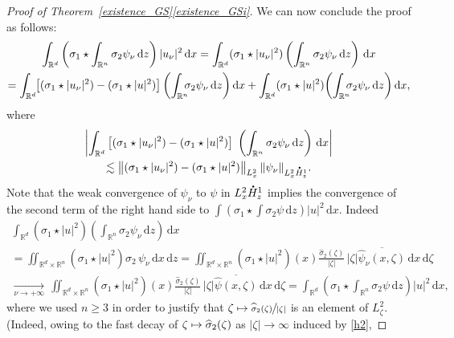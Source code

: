 \documentclass[JEP,XML,SOM,NoEqCountersInSection,NoFloatCountersInSection,Unicode,published]{cedram}
\newcommand\mto{\mathchoice{\longmapsto}{\mapsto}{\mapsto}{\mapsto}}
\theoremstyle{definition}
\newcommand*{\overbigdot}[1]{%
\accentset{\mbox{\large\bfseries .}}{#1}}
\newenvironment{ProofOf}[1]{\begin{proof}[Proof of #1]}{\end{proof}}
\newcommand{\R}{\mathbb{R}}
\newcommand{\ud}{\, {\mathrm{d}}}
\begin{document}
\begin{ProofOf}{Theorem~\ref{existence_GS}\eqref{existence_GSi}}
We can now conclude the proof as follows:
\bgroup
{}
\begin{multline*}
\int_{\R^{d}}\left(\sigma_{1}\star\int_{\R^{n}}\sigma_{2}\psi_{\nu}\ud z\right)|u_{\nu}|^{2}\ud x=\int_{\R^{d}}(\sigma_{1}\star|u_{\nu}|^{2})\left(\int_{\R^{n}}\sigma_{2}\psi_{\nu}\ud z\right)\ud x\\
=\int_{\R^{d}}\hspace*{-1mm}\left[(\sigma_{1}\star|u_{\nu}|^{2})-(\sigma_{1}\star|u|^{2})\right]\biggl(\int_{\R^{n}}\hspace*{-2mm}\sigma_{2}\psi_{\nu}\ud z\biggr)\ud x+\int_{\R^{d}}(\sigma_{1}\star|u|^{2})\biggl(\int_{\R^{n}}\hspace*{-2mm}\sigma_{2}\psi_{\nu}\ud z\biggr)\ud x,
\end{multline*}
\egroup
where
\begin{multline*}
\left|\int_{\R^{d}}\left[(\sigma_{1}\star|u_{\nu}|^{2})-(\sigma_{1}\star|u|^{2})\right]\;\left(\int_{\R^{n}}\sigma_{2}\psi_{\nu}\ud z\right)\ud x\right|\\
\lesssim\left\|(\sigma_{1}\star|u_{\nu}|^{2})-(\sigma_{1}\star|u|^{2})\right\|_{L_{x}^{2}}\|\psi_{\nu}\|_{L_{x}^{2}\overbigdot{H}_{z}^{1}}.
\end{multline*}
Note that the weak convergence of $\psi_{\nu}$ to $\psi$ in $L_{x}^{2}\overbigdot{H}_{z}^{1}$ implies the convergence of the second term of the right hand side to $\int(\sigma_{1}\star\int\sigma_{2}\psi\ud z)|u|^{2}\ud x$. Indeed
\bgroup
{}
\begin{multline*}
\int_{\R^{d}}(\sigma_{1}\star|u|^{2})\left(\int_{\R^{n}}\sigma_{2}\psi_{\nu}\ud z\right)\ud x\\
=\iint_{\R^{d}\times\R^{n}}(\sigma_{1}\star|u|^{2})\sigma_{2}\,\psi_{\nu}\ud x\ud z
=\iint_{\R^{d}\times\R^{n}} (\sigma_{1}
\star|u|^{2})(x)\frac{\widehat{\sigma}_{2}(\zeta)}{ |\zeta|} \,|\zeta|\overline{\widehat{\psi}_{\nu}(x,\zeta)}\ud x\ud \zeta\\
\underset{\nu\to +\infty}{\to}\,\iint_{\R^{d}\times\R^{n}}
(\sigma_{1}\star|u|^{2})(x)\frac{\widehat{\sigma}_{2}(\zeta)}{ |\zeta|}\, |\zeta|\overline{\widehat{\psi}(x,\zeta)}\ud x\ud\zeta
=\int_{\R^{d}}\left(\sigma_{1}\star\int_{\R^{n}}\sigma_{2}\psi\ud z\right)|u|^{2}\ud x,
\end{multline*}
\egroup
where we used $n\geq 3$ in order to justify that $\zeta\mto\sfrac{\widehat{\sigma}_{2}(\zeta)}{|\zeta|}$ is an element of $L_{\zeta}^{2}$.
(Indeed, owing to the fast decay of $\zeta\mto \widehat{\sigma}_{2}(\zeta)$ as $|\zeta|\to \infty$ induced by \eqref{h2},

\end{ProofOf}
\end{document}
